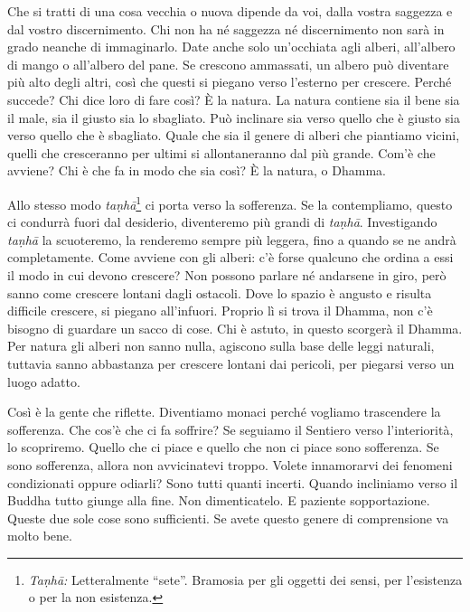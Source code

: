 Che si tratti di una cosa vecchia o nuova dipende da voi, dalla vostra
saggezza e dal vostro discernimento. Chi non ha né saggezza né
discernimento non sarà in grado neanche di immaginarlo. Date anche solo
un'occhiata agli alberi, all'albero di mango o all'albero del pane. Se
crescono ammassati, un albero può diventare più alto degli altri, così
che questi si piegano verso l'esterno per crescere. Perché succede? Chi
dice loro di fare così? È la natura. La natura contiene sia il bene sia
il male, sia il giusto sia lo sbagliato. Può inclinare sia verso quello
che è giusto sia verso quello che è sbagliato. Quale che sia il genere
di alberi che piantiamo vicini, quelli che cresceranno per ultimi si
allontaneranno dal più grande. Com'è che avviene? Chi è che fa in modo
che sia così? È la natura, o Dhamma.

Allo stesso modo \emph{taṇhā}\footnote{\emph{Taṇhā:} Letteralmente
  ``sete''. Bramosia per gli oggetti dei sensi, per l'esistenza o per la
  non esistenza.} ci porta verso la sofferenza. Se la contempliamo,
questo ci condurrà fuori dal desiderio, diventeremo più grandi di
\emph{taṇhā}. Investigando \emph{taṇhā} la scuoteremo, la renderemo
sempre più leggera, fino a quando se ne andrà completamente. Come
avviene con gli alberi: c'è forse qualcuno che ordina a essi il modo in
cui devono crescere? Non possono parlare né andarsene in giro, però
sanno come crescere lontani dagli ostacoli. Dove lo spazio è angusto e
risulta difficile crescere, si piegano all'infuori. Proprio lì si trova
il Dhamma, non c'è bisogno di guardare un sacco di cose. Chi è astuto,
in questo scorgerà il Dhamma. Per natura gli alberi non sanno nulla,
agiscono sulla base delle leggi naturali, tuttavia sanno abbastanza per
crescere lontani dai pericoli, per piegarsi verso un luogo adatto.

Così è la gente che riflette. Diventiamo monaci perché vogliamo
trascendere la sofferenza. Che cos'è che ci fa soffrire? Se seguiamo il
Sentiero verso l'interiorità, lo scopriremo. Quello che ci piace e
quello che non ci piace sono sofferenza. Se sono sofferenza, allora non
avvicinatevi troppo. Volete innamorarvi dei fenomeni condizionati oppure
odiarli? Sono tutti quanti incerti. Quando incliniamo verso il Buddha
tutto giunge alla fine. Non dimenticatelo. E paziente sopportazione.
Queste due sole cose sono sufficienti. Se avete questo genere di
comprensione va molto bene.

